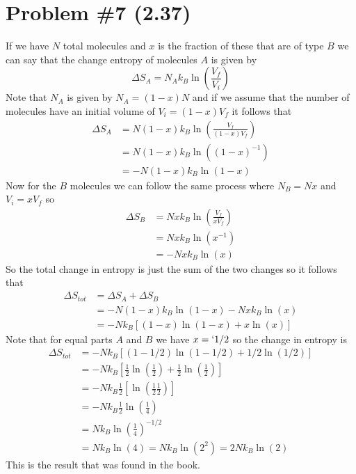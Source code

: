 \documentclass[11pt]{article}
\numberwithin{equation}{section}
\begin{document}
\section{Problem \#7 (2.37)}
If we have $N$ total molecules and $x$ is the fraction of these that are of type $B$ we can say that the change entropy of molecules $A$ is given by
$$\Delta S_A = N_Ak_B\ln\left(\frac{V_f}{V_i}\right)$$
Note that $N_A$ is given by $N_A = (1-x)N$ and if we assume that the number of molecules have an initial volume of $V_i = (1-x)V_f$ it follows that
\begin{align*}
\Delta S_A &= N(1-x)k_B\ln\left(\frac{V_f}{(1-x)V_f}\right)\\
&= N(1-x)k_B\ln\left((1-x)^{-1}\right)\\
&= -N(1-x)k_B\ln\left(1-x\right)
\end{align*}
Now for the $B$ molecules we can follow the same process where $N_B = Nx$ and $V_i = xV_f$ so
\begin{align*}
\Delta S_B &= Nxk_B\ln\left(\frac{V_f}{xV_f}\right)\\
&= Nxk_B\ln\left(x^{-1}\right)\\
&= -Nxk_B\ln\left(x\right)
\end{align*}
So the total change in entropy is just the sum of the two changes so it follows that
\begin{align*}
\Delta S_{tot} &= \Delta S_A + \Delta S_B\\
&= -N(1-x)k_B\ln\left(1-x\right) -Nxk_B\ln\left(x\right)\\
&= -Nk_B\left[(1-x)\ln\left(1-x\right) + x\ln\left(x\right)\right]
\end{align*}
Note that for equal parts $A$ and $B$ we have $x=`1/2$ so the change in entropy is 
\begin{align*}
\Delta S_{tot} &= -Nk_B\left[(1-1/2)\ln\left(1-1/2\right) + 1/2\ln\left(1/2\right)\right]\\
&= -Nk_B\left[\frac{1}{2}\ln\left(\frac{1}{2}\right) + \frac{1}{2}\ln\left(\frac{1}{2}\right)\right]\\
&= -Nk_B\frac{1}{2}\left[\ln\left(\frac{1}{2}\frac{1}{2}\right)\right]\\
&= -Nk_B\frac{1}{2}\ln\left(\frac{1}{4}\right)\\
&= Nk_B\ln\left(\frac{1}{4}\right)^{-1/2}\\
&= Nk_B\ln\left(4\right) =  Nk_B\ln\left(2^2\right) =  2Nk_B\ln\left(2\right) 
\end{align*}
This is the result that was found in the book.
\end{document}
